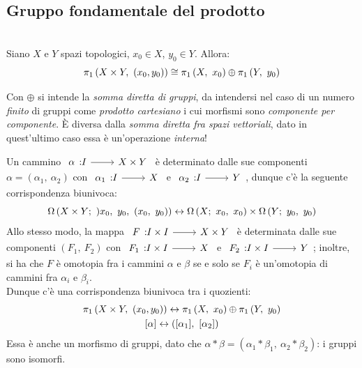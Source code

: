 \subsection{Gruppo fondamentale del prodotto}
\begin{theorema}~{}\\
	Siano $X$ e $Y$ spazi topologici, $x_0\in X$, $y_0\in Y$. Allora:
	\begin{equation}
		\gruf{X\times Y}{(x_0,y_0)}\cong \gruf{X}{x_0}\oplus \gruf{Y}{y_0}
	\end{equation}
\vspace{-6mm}
\end{theorema}
\begin{attention}
	Con $\oplus$ si intende la \textit{somma diretta di gruppi}, da intendersi nel caso di un numero \textit{finito} di gruppi come \textit{prodotto cartesiano} i cui morfismi sono \textit{componente per componente}. È diversa dalla \textit{somma diretta fra spazi vettoriali}, dato in quest'ultimo caso essa è un'operazione \textit{interna}!
\end{attention}
\begin{demonstration}
	Un cammino $\funz \alpha I {X\times Y}$ è determinato dalle sue componenti $\alpha=(\alpha_1,\ \alpha_2)$ con $\funz {\alpha_1} I X$ e $\funz {\alpha_2} I Y$, dunque c'è la seguente corrispondenza biunivoca:
	\begin{equation*}
		\inscam{X\times Y}{)x_0,\ y_0}{(x_0,\ y_0)}\leftrightarrow\inscam{X}{x_0}{x_0}\times \inscam{Y}{y_0}{y_0}
	\end{equation*}
Allo stesso modo, la mappa $\funz F {I\times I} {X\times Y}$ è determinata dalle sue componenti $(F_1,\ F_2)$ con $ \funz {F_1} {I\times I} X$ e $\funz {F_2} {I\times I} Y$; inoltre, si ha che $F$ è omotopia fra i cammini $\alpha$ e $\beta$ se e solo se $F_i$ è un'omotopia di cammini fra $\alpha_i$ e $\beta_i$. \\
Dunque c'è una corrispondenza biunivoca tra i quozienti:
\begin{gather*}
	\gruf{X\times Y}{(x_0,y_0)}\leftrightarrow \gruf{X}{x_0}\oplus \gruf{Y}{y_0}\\
	[\alpha]\leftrightarrow ([\alpha_1],\ [\alpha_2])
\end{gather*}
Essa è anche un morfismo di gruppi, dato che $\alpha\ast\beta = (\alpha_1\ast\beta_1,\ \alpha_2\ast\beta_2)$: i gruppi sono isomorfi.
\end{demonstration}
